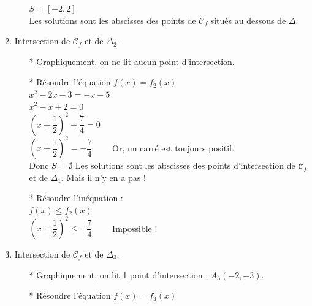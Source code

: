 \begin{enumerate}
\begin{itemize}
$S = [-2, 2]$ \\

Les solutions sont les abscisses des points de $\mathcal{C}_f$ situés au dessous de $\Delta$.\\

\end{itemize} 


\item Intersection de $\mathcal{C}_f$ et de $\Delta_2$.

\begin{itemize}
\item [*] Graphiquement, on ne lit aucun point d'intersection.

\item [*] Résoudre l'équation $f(x) = f_2(x)$\\

$ x^2 -2x -3 = -x - 5$\\
$ x^2 -x  +2 = 0 $\\

$(x + \dfrac{1}{2})^2 +\dfrac{7}{4} = 0 $\\

$(x + \dfrac{1}{2})^2 = -\dfrac{7}{4} \qquad $ Or, un carré est toujours positif.\\

Donc $S= \emptyset $ Les solutions sont les abscisses 
               des points d'intersection de $\mathcal{C}_f$ et de $\Delta_1$. Mais il n'y en a pas !\\
               
\item [*] Résoudre l'inéquation : \\

$f(x) \leqslant f_2(x)$\\

$(x + \dfrac{1}{2})^2 \leqslant -\dfrac{7}{4} \qquad $ Impossible !

\end{itemize} 

\newpage

\item Intersection de $\mathcal{C}_f$ et de $\Delta_3$.

\begin{itemize}
\item [*] Graphiquement, on lit 1 point d'intersection : $A_3(-2, -3)$.

\item [*] Résoudre l'équation $f(x) = f_3(x)$\\


\end{itemize}
\end{enumerate}
